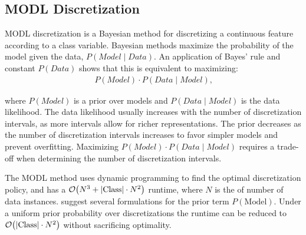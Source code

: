 
\subsection{MODL Discretization}
MODL discretization \citep{Boulle_2006} is a Bayesian method for discretizing a continuous feature according to a class variable. Bayesian methods maximize the probability of the model given the data, $P(\textit{Model} \mid \textit{Data})$. An application of Bayes' rule and constant $P(\textit{Data})$ shows that this is equivalent to maximizing:
\begin{align}
P(\textit{Model}) \cdot P(\textit{Data} \mid \textit{Model})\text{,}
\end{align}

\noindent
where $P(\textit{Model})$ is a prior over models and ${P(\textit{Data} \mid \textit{Model})}$ is the data likelihood.
The data likelihood usually increases with the number of discretization intervals, as more intervals allow for richer representations.
The prior decreases as the number of discretization intervals increases to favor simpler models and prevent overfitting.
Maximizing ${P(\textit{Model}) \cdot P(\textit{Data} \mid \textit{Model})}$ requires a trade-off when determining the number of discretization intervals.

The MODL method uses dynamic programming to find the optimal discretization policy, and has a $\bigo\paren{N^3 + |\text{Class}| \cdot N^2}$ runtime, where $N$ is the of number of data instances.
\cite{Lustgarten_2011} suggest several formulations for the prior term $P(\text{Model})$.
Under a uniform prior probability over discretizations the runtime can be reduced to $\bigo\paren{|\text{Class}| \cdot N^2}$ without sacrificing optimality.

